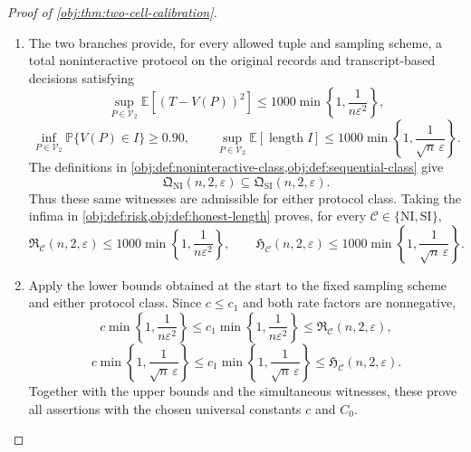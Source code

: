 \documentclass[11pt]{article}
\begin{document}
\begin{proof}[Proof of \cref{obj:thm:two-cell-calibration}]
\begin{enumerate}
Finally, the upper endpoint is at most \(T+q_{\mathrm{cal}}\), and the lower endpoint is at least \(T-q_{\mathrm{cal}}\). Consequently,
\[
\operatorname{length}I
\le2q_{\mathrm{cal}}
=\frac{200}{\sqrt n\,\varepsilon},
\]
and, under the probability decision law,
\[
\mathbb E[\operatorname{length}I]
\le\frac{200}{\sqrt n\,\varepsilon}
\le\frac{1000}{\sqrt n\,\varepsilon}.
\]
This completes the simultaneous attainment bounds in the branch \(t>1\).

\item
The two branches provide, for every allowed tuple and sampling scheme, a total noninteractive protocol on the original records and transcript-based decisions satisfying
\[
\sup_{P\in\mathcal V_2}\mathbb E[(T-V(P))^2]
\le1000\min\left\{1,\frac1{n\varepsilon^2}\right\},
\]
\[
\inf_{P\in\mathcal V_2}\mathbb P\{V(P)\in I\}\ge0.90,
\qquad
\sup_{P\in\mathcal V_2}\mathbb E[\operatorname{length}I]
\le1000\min\left\{1,\frac1{\sqrt n\,\varepsilon}\right\}.
\]
The definitions in
\cref{obj:def:noninteractive-class,obj:def:sequential-class} give
\[
\mathfrak Q_{\mathrm{NI}}(n,2,\varepsilon)
\subseteq
\mathfrak Q_{\mathrm{SI}}(n,2,\varepsilon).
\]
Thus these same witnesses are admissible for either protocol class. Taking the infima in
\cref{obj:def:risk,obj:def:honest-length} proves, for every
\(\mathcal C\in\{\mathrm{NI},\mathrm{SI}\}\),
\[
\mathfrak R_{\mathcal C}(n,2,\varepsilon)
\le1000\min\left\{1,\frac1{n\varepsilon^2}\right\},
\qquad
\mathfrak H_{\mathcal C}(n,2,\varepsilon)
\le1000\min\left\{1,\frac1{\sqrt n\,\varepsilon}\right\}.
\]

\item
Apply the lower bounds obtained at the start to the fixed sampling scheme and either protocol class. Since \(c\le c_1\) and both rate factors are nonnegative,
\[
c\min\left\{1,\frac1{n\varepsilon^2}\right\}
\le
c_1\min\left\{1,\frac1{n\varepsilon^2}\right\}
\le\mathfrak R_{\mathcal C}(n,2,\varepsilon),
\]
\[
c\min\left\{1,\frac1{\sqrt n\,\varepsilon}\right\}
\le
c_1\min\left\{1,\frac1{\sqrt n\,\varepsilon}\right\}
\le\mathfrak H_{\mathcal C}(n,2,\varepsilon).
\]
Together with the upper bounds and the simultaneous witnesses, these prove all assertions with the chosen universal constants \(c\) and \(C_0\).
\end{enumerate}
\end{proof}
\end{document}
